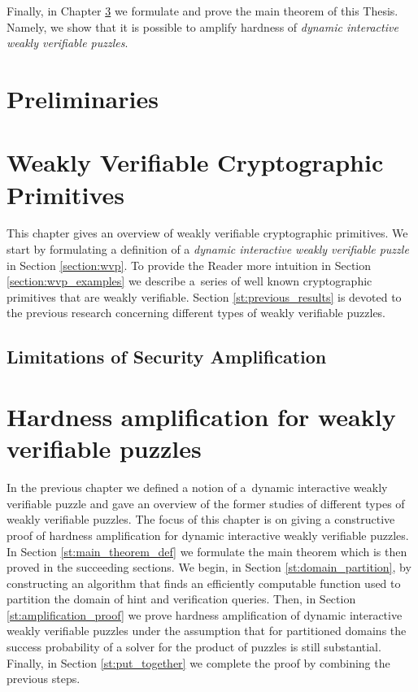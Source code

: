 \documentclass[11pt,a4paper,titlepage]{memoir}
\begin{document}
Finally, in Chapter \ref{ch:main_result} we formulate and prove the main theorem of this Thesis.
Namely, we show that it is possible to amplify hardness of \textit{dynamic interactive weakly verifiable puzzles}.
%
\chapter{Preliminaries}
\label{ch:preliminaries}


\chapter{Weakly Verifiable Cryptographic Primitives}
\label{ch:intro_weakly}
This chapter gives an overview of weakly verifiable cryptographic primitives.
We start by formulating a definition of a \textit{dynamic interactive weakly verifiable puzzle} in Section \ref{section:wvp}.
To provide the Reader more intuition in Section \ref{section:wvp_examples} we describe a~series of well known cryptographic primitives
that are weakly verifiable. Section \ref{st:previous_results} is devoted to the previous research concerning different types of weakly verifiable puzzles.
%



%
\section{Limitations of Security Amplification}
%
\chapter{Hardness amplification for weakly verifiable puzzles}
\label{ch:main_result}
In the previous chapter we defined a notion of a~dynamic interactive weakly verifiable puzzle
and gave an overview of the former studies of different types of weakly verifiable puzzles.
The focus of this chapter is on giving a constructive proof of hardness amplification for dynamic interactive weakly verifiable puzzles.
In Section \ref{st:main_theorem_def} we formulate the main theorem which is then proved in the succeeding sections.
We begin, in Section \ref{st:domain_partition}, by constructing an algorithm that finds an efficiently computable function used
to partition the domain of hint and verification queries. Then, in Section \ref{st:amplification_proof} we prove
hardness amplification of dynamic interactive weakly verifiable puzzles under the assumption that for partitioned domains
the success probability of a solver for the product of puzzles is still substantial.
Finally, in Section \ref{st:put_together} we complete the proof by combining the previous steps.
%

%

%

%

%
\end{document}
